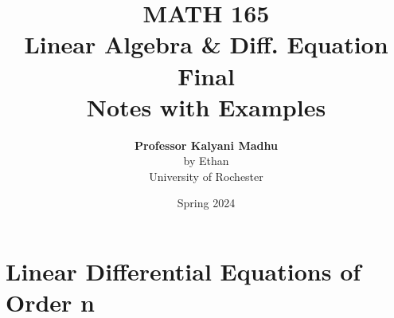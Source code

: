 \documentclass[oneside]{book}
\def\notetitle{MATH 165\\Linear Algebra \& Diff. Equation\\Final \\Notes with Examples}
\def\noteauthor{
    \textbf{Professor Kalyani Madhu} \\ 
    by Ethan\\
    University of Rochester}
\def\notedate{Spring 2024}
\begin{document}
\title{\textbf{
    \LARGE{\notetitle} \vspace*{10\baselineskip}}
    }
\author{\noteauthor}
\date{\notedate}

\maketitle
\newpage

\tableofcontents
\newpage

% 

% 
% 


\chapter{Linear Differential Equations of Order n}

% 
% 

% 
% 


% 
\end{document}
